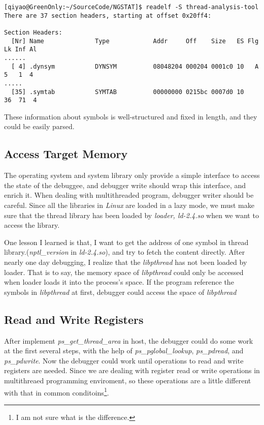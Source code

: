 \begin{verbatim}
[qiyao@GreenOnly:~/SourceCode/NGSTAT]$ readelf -S thread-analysis-tool
There are 37 section headers, starting at offset 0x20ff4:

Section Headers:
  [Nr] Name              Type            Addr     Off    Size   ES Flg Lk Inf Al
......
  [ 4] .dynsym           DYNSYM          08048204 000204 0001c0 10   A  5   1  4
.....
  [35] .symtab           SYMTAB          00000000 0215bc 0007d0 10     36  71  4
\end{verbatim}


These information about symbols is well-structured and fixed in length, and they could be easily parsed.

\subsection{Access Target Memory}

The operating system and system library only provide a simple interface to access the state of the debuggee,
and debugger write should wrap this interface, and enrich it.  When dealing with multithreaded program,
debugger writer should be careful.  Since all the libraries in \emph{Linux} are loaded in a lazy mode,
we must make sure that the thread library has been loaded by \emph{loader, ld-2.4.so} when we want to access
the library.

One lesson I learned is that, I want to  get the address of one symbol in thread library.(\emph{nptl\_version}
in \emph{ld-2.4.so}), and try to fetch the content directly.  After nearly one day debugging, I realize that
the \emph{libpthread} has not been loaded by loader.  That is to say, the memory space of \emph{libpthread} could
only be accessed when loader loads it into the process's space.  If the program reference the symbols in \emph{libpthread}
at first, debugger could access the space of \emph{libpthread}

\subsection{Read and Write Registers}
After implement \emph{ps\_get\_thread\_area} in host, the debugger could do some work at the first several steps, with the help of
\emph{ps\_pglobal\_lookup}, \emph{ps\_pdread}, and \emph{ps\_pdwrite}.  Now the debugger could work until operations to read and
write registers are needed.  Since we are dealing with register read or write operations in multithreaed programming enviroment,
so these operations are a little different with that in common conditoins\footnote{I am not sure what is the difference.}.

